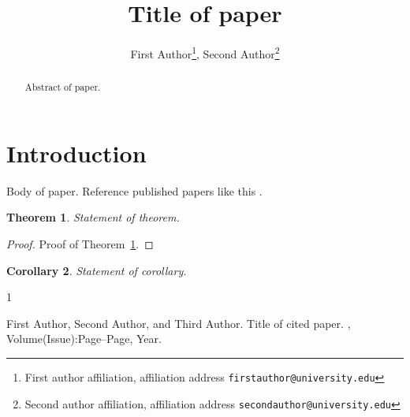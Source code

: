 \documentclass[twoside, 12pt]{article}
\newtheorem{theorem}{Theorem}[section]
\newtheorem{corollary}[theorem]{Corollary}
\begin{document}
\title{\bf Title of paper}
\author{First Author\footnote{First author affiliation, affiliation address  {\tt firstauthor@university.edu}}, Second Author\footnote{Second author affiliation, affiliation address {\tt secondauthor@university.edu}}}

\begin{abstract}
Abstract of paper.
\end{abstract}

\thispagestyle{empty}

\section{Introduction}

Body of paper.  Reference published papers like this \cite{CITE1}.

\begin{theorem}\label{Label1}
Statement of theorem.
\end{theorem}

\begin{proof}
Proof of Theorem~\ref{Label1}.
\end{proof}

\begin{corollary}
Statement of corollary.
\end{corollary}



\begin{thebibliography}{1}

First Author, Second Author, and Third Author.
\newblock Title of cited paper.
, Volume(Issue):Page--Page, Year.

\end{thebibliography}
\end{document}
